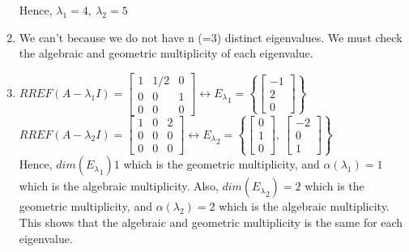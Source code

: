 \begin{SaveQuestion}
\begin{enumerate}
			Hence, $\lambda_1 = 4,\ \lambda_2 = 5$
			\item We can't because we do not have n (=3) distinct eigenvalues. We must check the algebraic and geometric multiplicity of each eigenvalue.
			\item $RREF(A-\lambda_1I) = \begin{bmatrix}
			1&1/2&0\\0&0&1\\0&0&0
			\end{bmatrix} \leftrightarrow {E_{\lambda}}_1 = \left\{\begin{bmatrix}
			-1\\2\\0
			\end{bmatrix}\right\}$\\
			$RREF(A-\lambda_{2}I) = \begin{bmatrix}
			1&0&2\\0&0&0\\0&0&0
			\end{bmatrix} \leftrightarrow {E_{\lambda}}_{2} = \left\{\begin{bmatrix}
			0\\1\\0
			\end{bmatrix},\ \begin{bmatrix}
			-2\\0\\1
			\end{bmatrix}\right\}$\\
			Hence, $dim({E_{\lambda}}_{1}) 1$ which is the geometric multiplicity, and $\alpha(\lambda_1) = 1$ which is the algebraic multiplicity. Also, $dim({E_{\lambda}}_{2} )= 2$ which is the geometric multiplicity, and $\alpha(\lambda_{2}) = 2$ which is the algebraic multiplicity. This shows that the algebraic and geometric multiplicity is the same for each eigenvalue.
			

\end{enumerate}
\end{SaveQuestion}
